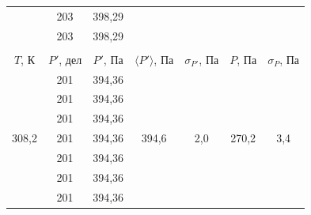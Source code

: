 \documentclass[a4paper, 12pt]{article}
\begin{document}
\begin{table}[H]
\begin{tabular}{ccccccc}
                \multicolumn{1}{|c|}{} & \multicolumn{1}{c|}{203} & \multicolumn{1}{c|}{398,29} & \multicolumn{1}{c|}{} & \multicolumn{1}{c|}{} & \multicolumn{1}{c|}{} & \multicolumn{1}{c|}{} \\ \cline{2-3}
                \multicolumn{1}{|c|}{} & \multicolumn{1}{c|}{203} & \multicolumn{1}{c|}{398,29} & \multicolumn{1}{c|}{} & \multicolumn{1}{c|}{} & \multicolumn{1}{c|}{} & \multicolumn{1}{c|}{} \\ \hline
    		&
    		&
    		&
    		&
    		&
    		&
    		\\ \hline
    		\multicolumn{1}{|c|}{$ T $, К} &
    		\multicolumn{1}{c|}{$ P' $, дел} &
    		\multicolumn{1}{c|}{$ P' $, Па} &
    		\multicolumn{1}{c|}{$ \langle P' \rangle $, Па} &
    		\multicolumn{1}{c|}{$ \sigma_{P'} $, Па} &
    		\multicolumn{1}{c|}{$ P $, Па} &
    		\multicolumn{1}{c|}{$ \sigma_P $, Па} \\ \hline
                \multicolumn{1}{|c|}{\multirow{10}{*}{308,2}} & \multicolumn{1}{c|}{201} & \multicolumn{1}{c|}{394,36} & \multicolumn{1}{c|}{\multirow{10}{*}{394,6}} & \multicolumn{1}{c|}{\multirow{10}{*}{2,0}} & \multicolumn{1}{c|}{\multirow{10}{*}{270,2}} & \multicolumn{1}{c|}{\multirow{10}{*}{3,4}} \\ \cline{2-3}
                \multicolumn{1}{|c|}{} & \multicolumn{1}{c|}{201} & \multicolumn{1}{c|}{394,36} & \multicolumn{1}{c|}{} & \multicolumn{1}{c|}{} & \multicolumn{1}{c|}{} & \multicolumn{1}{c|}{} \\ \cline{2-3}
                \multicolumn{1}{|c|}{} & \multicolumn{1}{c|}{201} & \multicolumn{1}{c|}{394,36} & \multicolumn{1}{c|}{} & \multicolumn{1}{c|}{} & \multicolumn{1}{c|}{} & \multicolumn{1}{c|}{} \\ \cline{2-3}
                \multicolumn{1}{|c|}{} & \multicolumn{1}{c|}{201} & \multicolumn{1}{c|}{394,36} & \multicolumn{1}{c|}{} & \multicolumn{1}{c|}{} & \multicolumn{1}{c|}{} & \multicolumn{1}{c|}{} \\ \cline{2-3}
                \multicolumn{1}{|c|}{} & \multicolumn{1}{c|}{201} & \multicolumn{1}{c|}{394,36} & \multicolumn{1}{c|}{} & \multicolumn{1}{c|}{} & \multicolumn{1}{c|}{} & \multicolumn{1}{c|}{} \\ \cline{2-3}
                \multicolumn{1}{|c|}{} & \multicolumn{1}{c|}{201} & \multicolumn{1}{c|}{394,36} & \multicolumn{1}{c|}{} & \multicolumn{1}{c|}{} & \multicolumn{1}{c|}{} & \multicolumn{1}{c|}{} \\ \cline{2-3}
                \multicolumn{1}{|c|}{} & \multicolumn{1}{c|}{201} & \multicolumn{1}{c|}{394,36} & \multicolumn{1}{c|}{} & \multicolumn{1}{c|}{} & \multicolumn{1}{c|}{} & \multicolumn{1}{c|}{} \\ \cline{2-3}

\end{tabular}
\end{table}
\end{document}
